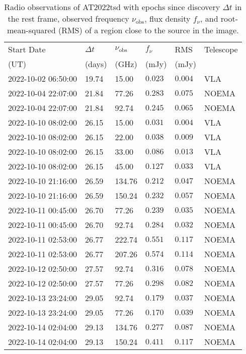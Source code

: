 \documentclass{nature_plusfigure}
\begin{document}
\begin{supplement}
\begin{center} 
\begin{longtable}{llllll} 
\caption{Radio observations of AT2022tsd with epochs since discovery $\Delta t$ in the rest frame, observed frequency $\nu_\mathrm{obs}$, flux density $f_\nu$, and root-mean-squared (RMS) of a region close to the source in the image.} 
\label{tab:radio-observations}\\ 
\hline\hline
Start Date & $\Delta t$ & $\nu_\mathrm{obs}$ & $f_\nu$ & RMS & Telescope\\ 
(UT) & (days) & (GHz) & (mJy) & (mJy) & \\ 
\hline
2022-10-02 06:50:00 & 19.74 & 15.00 & $0.023$ & $0.004$ & VLA \\ 
2022-10-04 22:07:00 & 21.84 & 77.26 & $0.283$ & $0.075$ & NOEMA \\ 
2022-10-04 22:07:00 & 21.84 & 92.74 & $0.245$ & $0.065$ & NOEMA \\ 
2022-10-10 08:02:00 & 26.15 & 15.00 & $0.031$ & $0.004$ & VLA \\ 
2022-10-10 08:02:00 & 26.15 & 22.00 & $0.038$ & $0.009$ & VLA \\ 
2022-10-10 08:02:00 & 26.15 & 33.00 & $0.086$ & $0.013$ & VLA \\ 
2022-10-10 08:02:00 & 26.15 & 45.00 & $0.127$ & $0.033$ & VLA \\ 
2022-10-10 21:16:00 & 26.59 & 134.76 & $0.212$ & $0.047$ & NOEMA \\ 
2022-10-10 21:16:00 & 26.59 & 150.24 & $0.232$ & $0.057$ & NOEMA \\ 
2022-10-11 00:45:00 & 26.70 & 77.26 & $0.239$ & $0.035$ & NOEMA \\ 
2022-10-11 00:45:00 & 26.70 & 92.74 & $0.284$ & $0.032$ & NOEMA \\ 
2022-10-11 02:53:00 & 26.77 & 222.74 & $0.551$ & $0.117$ & NOEMA \\ 
2022-10-11 02:53:00 & 26.77 & 207.26 & $0.574$ & $0.114$ & NOEMA \\ 
2022-10-12 02:50:00 & 27.57 & 92.74 & $0.316$ & $0.078$ & NOEMA \\ 
2022-10-12 02:50:00 & 27.57 & 77.26 & $0.298$ & $0.082$ & NOEMA \\ 
2022-10-13 23:24:00 & 29.05 & 92.74 & $0.179$ & $0.037$ & NOEMA \\ 
2022-10-13 23:24:00 & 29.05 & 77.26 & $0.170$ & $0.039$ & NOEMA \\ 
2022-10-14 02:04:00 & 29.13 & 134.76 & $0.277$ & $0.087$ & NOEMA \\ 
2022-10-14 02:04:00 & 29.13 & 150.24 & $0.411$ & $0.117$ & NOEMA \\ 

\end{longtable}
\end{center}
\end{supplement}
\end{document}

